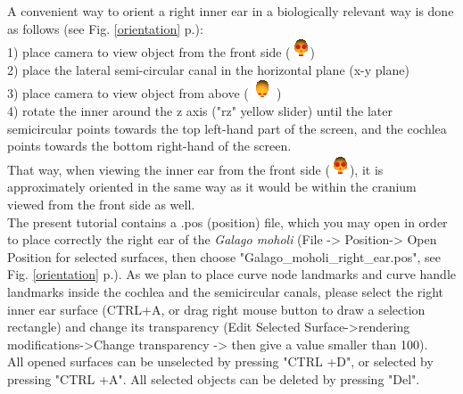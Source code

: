 \documentclass[12pt, a4paper]{book}
\begin{document}
A convenient way to orient a right inner ear in a biologically relevant way is done as follows (see Fig. \ref{orientation} p.\pageref{orientation}):\\
1) place camera to view object from the front side (\includegraphics[scale=0.7]{../images/06/camera/camera_front.png})\\
2) place the lateral semi-circular canal in the horizontal plane (x-y plane)\\
3) place camera  to view object from above ( \includegraphics[scale=0.7]{../images/06/camera/camera_above.png} )\\
4) rotate the inner around the z axis ("rz" yellow slider) until the later semicircular points towards the top left-hand part of the screen, and the cochlea points towards the bottom right-hand of the screen.\\
That way, when viewing the inner ear from the front side (\includegraphics[scale=0.7]{../images/06/camera/camera_front.png}), it is approximately oriented in the same way as it would be within the cranium viewed from the front side as well.\\

The present tutorial contains a .pos (position) file, which you may open in order to place correctly the right ear of the \textit{Galago moholi} (File -> Position-> Open Position for selected surfaces, then choose "Galago\_moholi\_right\_ear.pos", see Fig. \ref{orientation} p.\pageref{orientation}). As we plan to place curve node landmarks and curve handle landmarks inside the cochlea and the semicircular canals, please select the right inner ear surface (CTRL+A, or drag right mouse button to draw a selection rectangle) and change its transparency (Edit Selected Surface->rendering modifications->Change transparency -> then give a value smaller than 100).\\
All opened surfaces can be unselected by pressing "CTRL +D", or selected by pressing "CTRL +A". All selected objects can be deleted by pressing "Del".
\end{document}
